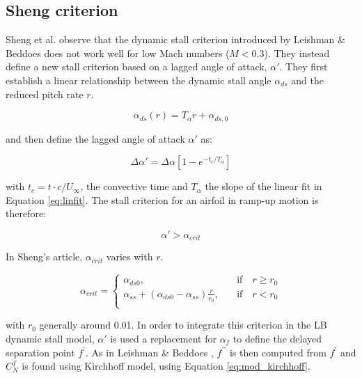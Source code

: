 \subsection{Sheng criterion}
\label{section:sheng_criterion}
Sheng et al. observe \cite{sheng_new_2006} that the dynamic stall criterion introduced by Leishman \& Beddoes does not work well for low Mach numbers ($M<0.3$). They instead define a new stall criterion based 
on a lagged angle of attack, $\alpha'$. They first establish a linear relationship between the dynamic stall angle $\alpha_{ds}$ and the reduced pitch rate $r$. 

\begin{equation}
	\alpha_{ds}(r) = T_\alpha r+\alpha_{ds,0}
	\label{eq:linfit}
\end{equation}

\noindent and then define the lagged angle of attack $\alpha'$ as:

\begin{equation}
\Delta \alpha' = \Delta \alpha\left[1-e^{-t_c/T_\alpha} \right]
\label{eq:alpha_lag}
\end{equation}

\noindent with $t_c=t \cdot c/U_{\infty}$, the convective time and $T_\alpha$ the slope of the linear fit in Equation \ref{eq:linfit}. The stall criterion for an airfoil in ramp-up motion is therefore: 

\begin{equation}
\alpha' > \alpha_{crit}
\label{eq:stall_criterion}
\end{equation}

In Sheng's article, $\alpha_{crit}$ varies with $r$. 

\begin{equation}
\alpha_{crit} =
\begin{cases}
\alpha_{ds0}, &\quad \text{if} \quad r \geq r_0 \\
\alpha_{ss} + (\alpha_{ds0}-\alpha_{ss}) \frac{r}{r_0}, &\quad \text{if} \quad r < r_0 \\
\end{cases}
\label{eq:alpha_crit}
\end{equation}

\noindent with $r_0$ generally around 0.01. In order to integrate this criterion in the LB dynamic stall model, $\alpha'$ is used a replacement for $\alpha_f$ to define the delayed separation point $f^{\prime}$. As in Leishman \& Beddoes \cite{leishman_semi-empirical_1989}, $f^{\prime \prime}$ is then computed from $f^{\prime}$ and $C_N^f$ is found using Kirchhoff model, using Equation \eqref{eq:mod_kirchhoff}. 


